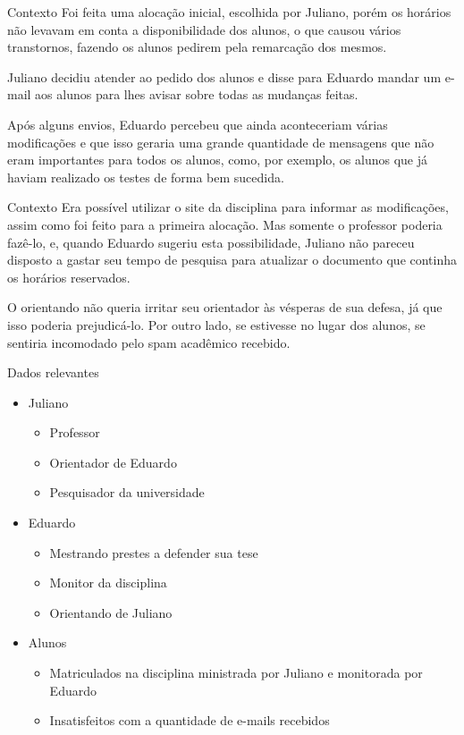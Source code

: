 \documentclass[dvipdfm]{beamer}
\begin{document}
\begin{frame}{Contexto}
	\hspace{1pc}Foi feita uma alocação inicial, escolhida por Juliano, porém os horários não levavam em conta a disponibilidade dos alunos, o que causou vários transtornos, fazendo os alunos pedirem pela remarcação dos mesmos.
	
	\hspace{1pc}Juliano decidiu atender ao pedido dos alunos e disse para Eduardo mandar um e-mail aos alunos para lhes avisar sobre todas as mudanças feitas.
	
	\hspace{1pc}Após alguns envios, Eduardo percebeu que ainda aconteceriam várias modificações e que isso geraria uma grande quantidade de mensagens que não eram importantes para todos os alunos, como, por exemplo, os alunos que já haviam realizado os testes de forma bem sucedida.
\end{frame}

\begin{frame}{Contexto}
	\hspace{1pc}Era possível utilizar o site da disciplina para informar as modificações, assim como foi feito para a primeira alocação. 
	Mas somente o professor poderia fazê-lo, e, quando Eduardo sugeriu esta possibilidade, Juliano não pareceu disposto a gastar seu tempo de pesquisa para atualizar o documento que continha os horários reservados.
	
	\hspace{1pc}O orientando não queria irritar seu orientador às vésperas de sua defesa, já que isso poderia prejudicá-lo. 
	Por outro lado, se estivesse no lugar dos alunos, se sentiria incomodado pelo spam acadêmico recebido.
\end{frame}

\begin{frame}{Dados relevantes}
	\begin{itemize}
			\item Juliano
				\begin{itemize}
					\item Professor
					\item Orientador de Eduardo
					\item Pesquisador da universidade
				\end{itemize}
			\item Eduardo
				\begin{itemize} 
					\item Mestrando prestes a defender sua tese
					\item Monitor da disciplina
					\item Orientando de Juliano
				\end{itemize} 
			\item Alunos
				\begin{itemize} 
					\item	Matriculados na disciplina ministrada por Juliano e monitorada por Eduardo
					\item Insatisfeitos com a quantidade de e-mails recebidos
				\end{itemize}
		\end{itemize}
\end{frame}
\end{document}
